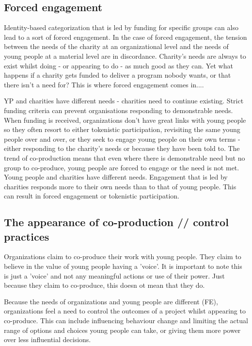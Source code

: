 \subsection{Forced engagement}
Identity-based categorization that is led by funding for specific groups can also lead to a sort of forced engagement. In the case of forced engagement, the tension between the needs of the charity at an organizational level and the needs of young people at a material level are in discordance. Charity's needs are always to exist whilst doing - or appearing to do - as much good as they can. Yet what happens if a charity gets funded to deliver a program nobody wants, or that there isn't a need for? This is where forced engagement comes in....

YP and charities have different needs - charities need to continue existing. Strict funding criteria can prevent organisations responding to demonstrable needs. When funding is received, organizations don't have great links with young people so they often resort to either tokenistic participation, revisiting the same young people over and over, or they seek to engage young people on their own terms - either responding to the charity's needs or because they have been told to. The trend of co-production means that even where there is demonstrable need but no group to co-produce, young people are forced to engage or the need is not met.
Young people and charities have different needs. Engagement that is led by charities responds more to their own needs than to that of young people. This can result in forced engagement or tokenistic participation.

\subsection{The appearance of co-production // control practices}
Organizations claim to co-produce their work with young people. They claim to believe in the value of young people having a 'voice'. It is important to note this is just a 'voice' and not any meaningful actions or use of their power. Just because they claim to co-produce, this doesn ot mean that they do.

Because the needs of organizations and young people are different (FE), organizations feel a need to control the outcomes of a project whilst appearing to co-produce. This can include influencing behaviour change and limiting the actual range of options and choices young people can take, or giving them more power over less influential decisions.

